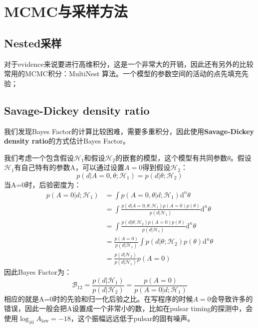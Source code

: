 \chapter{MCMC与采样方法}



\section{Nested采样}
对于evidence来说要进行高维积分，这是一个非常大的开销，因此还有另外的比较常用的MCMC积分：MultiNest 算法。一个模型的参数空间的活动的点先填充先验；

\section{Savage-Dickey density ratio}
我们发现Bayes Factor的计算比较困难，需要多重积分，因此使用\textbf{Savage-Dickey density ratio}的方式估计Bayes Factor。

我们考虑一个包含假设$\mathcal{H}_1$和假设$\mathcal{H}_2$的嵌套的模型，这个模型有共同参数$\theta$。假设$\mathcal{H}_1$有自己特有的参数A，可以通过设置$A=0$得到假设$\mathcal{H}_2$：
\begin{equation}
    p(d|A=0,\theta;\mathcal{H}_1)=p(d|\theta;\mathcal{H}_2)
\end{equation}
当A=0时，后验密度为：
\begin{equation}
    \begin{aligned}
        p(A=0|d;\mathcal{H}_1)&=\int p(A=0,\theta|d;\mathcal{H}_1)\mathrm{d}^n\theta\\
        &=\int \frac{p(d|A=0,\theta;\mathcal{H}_1)p(A=0)p(\theta)}{p(d|\mathcal{H}_1)}\mathrm{d}^n\theta\\
        &=\int \frac{p(d|\theta;\mathcal{H}_2)p(A=0)p(\theta)}{p(d|\mathcal{H}_1)}\mathrm{d}^n\theta\\
        &=\frac{p(A=0)}{p(d|\mathcal{H}_1)}\int p(d|\theta;\mathcal{H}_2)p(\theta)\mathrm{d}^n\theta\\
        &=\frac{p(d|\mathcal{H}_2)}{p(d|\mathcal{H}_1)}p(A=0)
    \end{aligned}
\end{equation}
因此Bayes Factor为：
\begin{equation}
    \mathcal{B}_{12}=\frac{p(d|\mathcal{H}_1)}{p(d|\mathcal{H}_2)}=\frac{p(A=0)}{p(A=0|d;\mathcal{H}_1)}
\end{equation}
相应的就是A=0时的先验和归一化后验之比。在写程序的时候$A=0$会导致许多的错误，因此一般会把A设置成一个非常小的数，比如在pulsar timing的探测中，会使用$\log_{10}A_{\mathrm{low}}=-18$，这个振幅远远低于pulsar的固有噪声。

